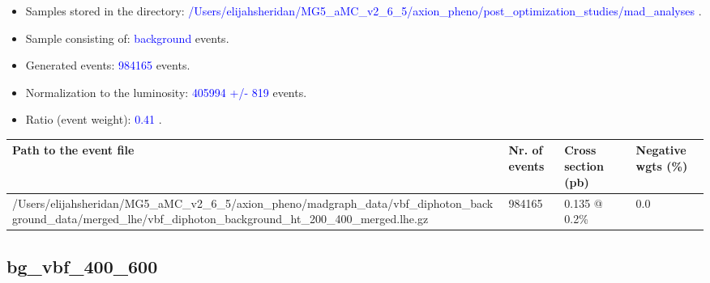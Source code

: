\documentclass[a4paper, 10pt]{article}
\begin{document}
\begin{itemize}
  \item Samples stored in the directory: \textcolor{blue}{/\-Users/\-elijahsheridan/\-MG5\_aMC\_v2\_6\_5/\-axion\_pheno/\-post\_optimization\_studies/\-mad\_analyses} .
   \item Sample consisting of: \textcolor{blue}{background}  events.
   \item Generated events: \textcolor{blue}{984165 }  events.
   \item Normalization to the luminosity: \textcolor{blue}{405994}\textcolor{blue}{ +/\-- }\textcolor{blue}{819 }  events.
   \item Ratio (event weight): \textcolor{blue}{0.41 } .  
 
\end{itemize}
\begin{table}[H]
  \begin{center}
    \begin{tabular}{|m{55.0mm}|m{25.0mm}|m{30.0mm}|m{30.0mm}|}
      \hline
      {\cellcolor{yellow}         Path to the event file}& {\cellcolor{yellow}         Nr. of events}& {\cellcolor{yellow}         Cross section (pb)}& {\cellcolor{yellow}         Negative wgts (\%)}\\
      \hline
      {\cellcolor{white}          /\-Users/\-elijahsheridan/\-MG5\_aMC\_v2\_6\_5/\-axion\_pheno/\-madgraph\_data/\-vbf\_diphoton\_background\_data/\-merged\_lhe/\-vbf\_diphoton\_background\_ht\_200\_400\_merged.lhe.gz}& {\cellcolor{white}          984165}& {\cellcolor{white}          0.135 @ 0.2\%}& {\cellcolor{white}          0.0}\\
\hline
    \end{tabular}
  \end{center}
\end{table}

\subsection{ bg\_vbf\_400\_600}
\end{document}
